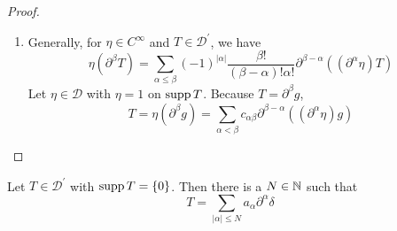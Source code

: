 \begin{enumerate}[label=\arabic*.]
\begin{proof}
\begin{enumerate}
			\item Generally, for $\eta \in C^\infty$ and $T \in \mathcal{D}^\prime$, we have
			\begin{equation*}
				\eta\left(\partial^\beta T\right)=\sum_{\alpha \leq \beta}(-1)^{|\alpha|} \frac{\beta!}{(\beta-\alpha)!\alpha!} \partial^{\beta-\alpha}\left(\left(\partial^\alpha \eta\right) T\right)
			\end{equation*}
			Let $\eta \in \mathcal{D}$ with $\eta = 1$ on $\operatorname{supp} T$. Because $T=\partial^\beta g$, 
			\begin{equation*}
				T=\eta\left(\partial^\beta g\right)=\sum_{\alpha<\beta} c_{\alpha \beta} \partial^{\beta-\alpha}\left(\left(\partial^\alpha \eta\right) g\right)
			\end{equation*}
		\end{enumerate}
	\end{proof}

	\begin{thm}
		Let $T \in \mathcal{D}^\prime$ with $\operatorname{supp} T =\left\{0\right\}$. Then there is a $N \in \mathbb{N}$ such that
		\begin{equation*}
			T=\sum_{|\alpha| \leq N} a_\alpha \partial^\alpha \delta
		\end{equation*}
	\end{thm}
\end{enumerate}

